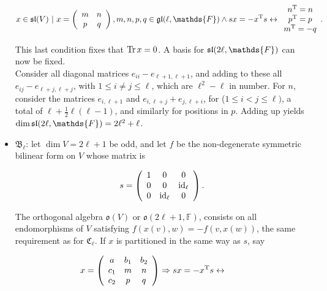 \documentclass{homework}
\begin{document}
\begin{itemize}
    $$
    x \in \symplecticalgebra(V) \blanky | \blanky   x = \left(\begin{array}{cc}
           m & n\\
           p & q 
        \end{array}\right), m,n,p,q \in \linearalgebra(\ell, \mathds{F}) \land sx = -x^{\textnormal{T}} s \leftrightarrow \begin{array}{c}
             n^{\textnormal{T}} = n  \\
             p^{\textnormal{T}} = p \\
             m^{\textnormal{T}} = -q
        \end{array}.
    $$
    
    This last condition fixes that $\Tr x = 0$. A basis for $\symplecticalgebra(2\ell, \mathds{F})$ can now be fixed. \\
    
    Consider all diagonal matrices $e_{ii} - e_{\ell + 1, \ell + 1}$, and adding to these all $e_{ij} - e_{\ell + j, \ell + j}$, with $1 \leq i \neq j \leq \ell$, which are $\ell^2 - \ell$ in number. For $n$, consider the matrices $e_{i, \ell + 1}$ and $e_{i, \ell + j} + e_{j, \ell + i}$, for ($1 \leq i < j \leq \ell)$, a total of $\ell + \frac{1}{2} \ell(\ell - 1)$, and similarly for positions in $p$. Adding up yields $\dim \symplecticalgebra(2\ell, \mathds{F}) = 2\ell^2 + \ell$. \\
    
    \item $\mathfrak{B}_{\ell}$: let $\dim V = 2\ell + 1$ be odd, and let $f$ be the non-degenerate symmetric bilinear form on $V$ whose matrix is 
    
    $$
        s = \left(\begin{array}{ccc}
           1 & 0 & 0 \\
           0 & 0 & \textnormal{i}\textnormal{d}_{\ell}  \\
           0 & \textnormal{i}\textnormal{d}_{\ell} & 0 
        \end{array}\right).
    $$
    
    The orthogonal algebra $\mathfrak{o}(V)$ or $\mathfrak{o}(2\ell +1, \mathds{F})$, consists on all endomorphisms of $V$ satisfying $f(x(v), w) = - f(v, x(w))$, the same requirement as for $\mathfrak{C}_{\ell}$. If $x$ is partitioned in the same way as $s$, say 
    
    $$
        x = \left(\begin{array}{ccc}
           a & b_1 & b_2 \\
           c_1 & m & n \\
           c_2 & p & q 
        \end{array}\right) \Rightarrow sx = - x^{\textnormal{T}}s \leftrightarrow \begin{array}{cc}
             &  \\
             & 
        \end{array}
    $$
    
\end{itemize}
\end{document}
